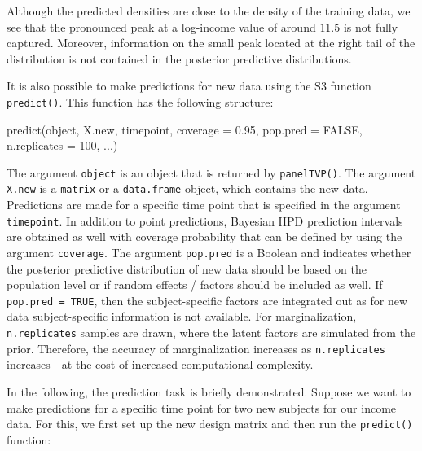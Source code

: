 \documentclass[a4paper, preprint, 3p,
authoryear]{elsarticle} %
\newenvironment{Shaded}{\begin{snugshade}}{\end{snugshade}}
\newcommand{\NormalTok}[1]{#1}
\begin{document}
Although the predicted densities are close to the density of the
training data, we see that the pronounced peak at a log-income value of
around \(11.5\) is not fully captured. Moreover, information on the
small peak located at the right tail of the distribution is not
contained in the posterior predictive distributions.

It is also possible to make predictions for new data using the S3
function \texttt{predict()}. This function has the following structure:

\begin{Shaded}
\begin{Highlighting}[]
\NormalTok{predict(object, X.new, timepoint, coverage = 0.95,}
\NormalTok{        pop.pred = FALSE, n.replicates = 100, ...)}
\end{Highlighting}
\end{Shaded}

The argument \texttt{object} is an object that is returned by
\texttt{panelTVP()}. The argument \texttt{X.new} is a \texttt{matrix} or
a \texttt{data.frame} object, which contains the new data. Predictions
are made for a specific time point that is specified in the argument
\texttt{timepoint}. In addition to point predictions, Bayesian HPD
prediction intervals are obtained as well with coverage probability that
can be defined by using the argument \texttt{coverage}. The argument
\texttt{pop.pred} is a Boolean and indicates whether the posterior
predictive distribution of new data should be based on the population
level or if random effects / factors should be included as well. If
\texttt{pop.pred = TRUE}, then the subject-specific factors are
integrated out as for new data subject-specific information is not
available. For marginalization, \texttt{n.replicates} samples are drawn,
where the latent factors are simulated from the prior. Therefore, the
accuracy of marginalization increases as \texttt{n.replicates} increases
- at the cost of increased computational complexity.

In the following, the prediction task is briefly demonstrated. Suppose
we want to make predictions for a specific time point for two new
subjects for our income data. For this, we first set up the new design
matrix and then run the \texttt{predict()} function:
\end{document}
